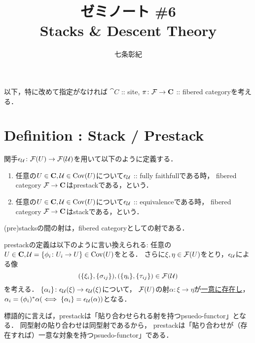 \documentclass[a4paper]{jsarticle}
\begin{document}
\title{ゼミノート \#6 \\ Stacks \& Descent Theory}
\author{七条彰紀}
\maketitle
\tableofcontents

以下，特に改めて指定がなければ
$\cat{C}$ :: site, 
$\pi \colon \mathcal{F} \to \mathbf{C}$ :: fibered categoryを考える．

\section{Definition : Stack / Prestack}
\begin{Def}
    関手$\epsilon_{\mathcal{U}} \colon \mathcal{F}(U) \to \mathcal{F}(\mathcal{U})$を用いて以下のように定義する．
    \begin{enumerate}[label=(\roman*)]
    \item
        任意の$U \in \mathbf{C}, \mathcal{U} \in \operatorname{Cov}(U)$について$\epsilon_{\mathcal{U}}$ :: fully faithfullである時，
        fibered category $\mathcal{F} \to \mathbf{C}$はprestackである，という．
    \item
        任意の$U \in \mathbf{C}, \mathcal{U} \in \operatorname{Cov}(U)$について$\epsilon_{\mathcal{U}}$ :: equivalenceである時，
        fibered category $\mathcal{F} \to \mathbf{C}$はstackである，という．
    \end{enumerate}

    (pre)stacksの間の射は，fibered categoryとしての射である．
\end{Def}

\begin{Remark}
    prestackの定義は以下のように言い換えられる:
    任意の$U \in \mathbf{C}, \mathcal{U}=\{\phi_i \colon U_i \to U\} \in \operatorname{Cov}(U)$をとる．
    さらに$\xi, \eta \in \mathcal{F}(U)$をとり，$\epsilon_{\mathcal{U}}$による像
    \[ (\{\xi_i\}, \{\sigma_{ij}\}), (\{\eta_i\}, \{\tau_{ij}\}) \in \mathcal{F}(\mathcal{U}) \]を考える．
    $\{\alpha_i\} \colon \epsilon_{\mathcal{U}}(\xi) \to \epsilon_{\mathcal{U}}(\xi)$について，
    $\mathcal{F}(U)$の射$\alpha \colon \xi \to \eta$が\underline{一意に存在し}，
    $\alpha_i=(\phi_i)^*\alpha (\iff \{\alpha_i\}=\epsilon_{\mathcal{U}}(\alpha))$となる．

    標語的に言えば，prestackは「貼り合わせられる射を持つpsuedo-functor」となる．
    同型射の貼り合わせは同型射であるから，
    prestackは「貼り合わせが（存在すれば）一意な対象を持つpsuedo-functor」である．
\end{Remark}
\end{document}
